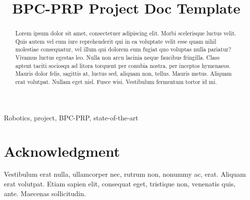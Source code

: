 \documentclass[conference]{IEEEtran}
\begin{document}
\title{BPC-PRP Project Doc Template}

\author{
\and
{}
}

\maketitle

\begin{abstract}
Lorem ipsum dolor sit amet, consectetuer adipiscing elit. Morbi scelerisque luctus velit. Quis autem vel eum iure reprehenderit qui in ea voluptate velit esse quam nihil molestiae consequatur, vel illum qui dolorem eum fugiat quo voluptas nulla pariatur? Vivamus luctus egestas leo. Nulla non arcu lacinia neque faucibus fringilla. Class aptent taciti sociosqu ad litora torquent per conubia nostra, per inceptos hymenaeos. Mauris dolor felis, sagittis at, luctus sed, aliquam non, tellus. Mauris metus. Aliquam erat volutpat. Nullam eget nisl. Fusce wisi. Vestibulum fermentum tortor id mi.
\end{abstract}

\begin{IEEEkeywords}
Robotics, project, BPC-PRP, state-of-the-art
\end{IEEEkeywords}







\section*{Acknowledgment}
Vestibulum erat nulla, ullamcorper nec, rutrum non, nonummy ac, erat. Aliquam erat volutpat. Etiam sapien elit, consequat eget, tristique non, venenatis quis, ante. Maecenas sollicitudin.

\printbibliography
\end{document}

